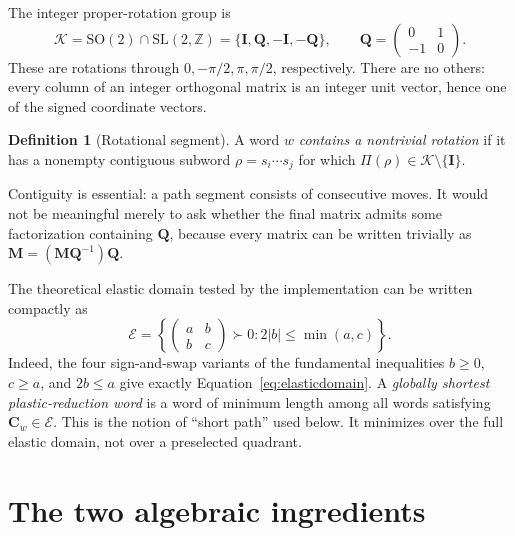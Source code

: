 \documentclass[11pt]{article}
\newcommand{\E}{\mathcal E}
\newcommand{\K}{\mathcal K}
\newcommand{\SLZ}{\mathrm{SL}(2,\mathbb Z)}
\newcommand{\wordprod}{\Pi}
\theoremstyle{definition}
\newtheorem{definition}{Definition}
\begin{document}
The integer proper-rotation group is
\begin{equation}
 \K=\mathrm{SO}(2)\cap\SLZ
 =\{\mathbf I,\mathbf Q,-\mathbf I,-\mathbf Q\},
 \qquad
 \mathbf Q=\begin{pmatrix}0&1\\-1&0\end{pmatrix}.
 \label{eq:rotationgroup}
\end{equation}
These are rotations through \(0,-\pi/2,\pi,\pi/2\), respectively.  There
are no others: every column of an integer orthogonal matrix is an integer
unit vector, hence one of the signed coordinate vectors.

\begin{definition}[Rotational segment]
A word \(w\) \emph{contains a nontrivial rotation} if it has a nonempty
contiguous subword \(\rho=s_i\cdots s_j\) for which
\(\wordprod(\rho)\in\K\setminus\{\mathbf I\}\).
\end{definition}

Contiguity is essential: a path segment consists of consecutive moves.  It
would not be meaningful merely to ask whether the final matrix admits some
factorization containing \(\mathbf Q\), because every matrix can be written
trivially as
\(\mathbf M=(\mathbf M\mathbf Q^{-1})\mathbf Q\).

The theoretical elastic domain tested by the implementation can be written
compactly as
\begin{equation}
 \E=\left\{
 \begin{pmatrix}a&b\\b&c\end{pmatrix}\succ0:
 2|b|\leq \min(a,c)
 \right\}.
 \label{eq:elasticdomain}
\end{equation}
Indeed, the four sign-and-swap variants of the fundamental inequalities
\(b\geq0\), \(c\geq a\), and \(2b\leq a\) give exactly
Equation~\eqref{eq:elasticdomain}.  A \emph{globally shortest plastic-reduction word}
is a word of minimum length among all words satisfying \(\mathbf C_w\in\E\).
This is the notion of ``short path'' used below.  It minimizes over the full
elastic domain, not over a preselected quadrant.

\section{The two algebraic ingredients}
\end{document}
